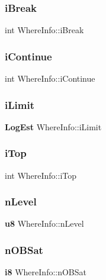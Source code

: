 \subsubsection{iBreak}
{\footnotesize\ttfamily int Where\+Info\+::i\+Break}

\mbox{\label{struct_where_info_a5b8eb73a6a5bba7ef126b9de13ee8537}} 
\subsubsection{iContinue}
{\footnotesize\ttfamily int Where\+Info\+::i\+Continue}

\mbox{\label{struct_where_info_a82f5ecf90452501ef3319b061723002d}} 
\subsubsection{iLimit}
{\footnotesize\ttfamily \textbf{ Log\+Est} Where\+Info\+::i\+Limit}

\mbox{\label{struct_where_info_a4edc0a92a162cbe63ac8f52e923fb038}} 
\subsubsection{iTop}
{\footnotesize\ttfamily int Where\+Info\+::i\+Top}

\mbox{\label{struct_where_info_a8d281ddf8ee87aa95200da9c73764026}} 
\subsubsection{nLevel}
{\footnotesize\ttfamily \textbf{ u8} Where\+Info\+::n\+Level}

\mbox{\label{struct_where_info_aa4914362bf727fe37cbdcd79796bf5b9}} 
\subsubsection{nOBSat}
{\footnotesize\ttfamily \textbf{ i8} Where\+Info\+::n\+O\+B\+Sat}

\mbox{\label{struct_where_info_a694860f22a9fb8d9edae023fc134cf6f}} 
